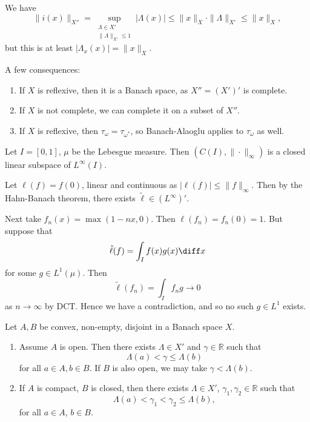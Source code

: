 \documentclass[12pt]{article}
\begin{document}
\begin{proofbox}
	We have
	\[
		\|i(x)\|_{X''} = \sup_{\substack{\Lambda \in X'\\\|\Lambda\|_{X'} \leq 1}}|\Lambda(x)| \leq \|x\|_X \cdot \|\Lambda\|_{X'} \leq \|x\|_X,
	\]
	but this is at least $|\Lambda_x(x)| = \|x\|_X$.
\end{proofbox}

A few consequences:
\begin{enumerate}
	\item If $X$ is reflexive, then it is a Banach space, as $X'' = (X')'$ is complete.
	\item If $X$ is not complete, we can complete it on a subset of $X''$.
	\item If $X$ is reflexive, then $\tau_\omega = \tau_{\omega^{\ast}}$, so Banach-Alaoglu applies to $\tau_\omega$ as well.
\end{enumerate}

\begin{exbox}
	Let $I = [0, 1]$, $\mu$ be the Lebesgue measure. Then $(C(I), \|\cdot\|_\infty)$ is a closed linear subspace of $L^\infty(I)$.

	Let $\ell(f) = f(0)$, linear and continuous as $|\ell(f)| \leq \|f\|_\infty$. Then by the Hahn-Banach theorem, there exists $\tilde \ell \in (L^\infty)'$.

	Next take $f_n(x) = \max(1-nx, 0)$. Then $\ell(f_n) = f_n(0) = 1$. But suppose that
	\[
	\tilde \ell (f) = \int_I f(x) g(x) \diff x
	\]
	for some $g \in L^1(\mu)$. Then
	\[
	\tilde \ell(f_n) = \int_I f_n g \to 0
	\]
	as $n \to \infty$ by DCT. Hence we have a contradiction, and so no such $g \in L^1$ exists.
\end{exbox}

\begin{theorem}
	Let $A, B$ be convex, non-empty, disjoint in a Banach space $X$.
	\begin{enumerate}[\normalfont(i)]
		\item Assume $A$ is open. Then there exists $\Lambda \in X'$ and $\gamma \in \mathbb{R}$ such that
			\[
			\Lambda(a) < \gamma \leq \Lambda(b)
			\]
			for all $a \in A, b \in B$. If $B$ is also open, we may take $\gamma < \Lambda(b)$.
		\item If $A$ is compact, $B$ is closed, then there exists $\Lambda \in X'$, $\gamma_1, \gamma_2 \in \mathbb{R}$ such that
			\[
			\Lambda(a) < \gamma_1 < \gamma_2 \leq \Lambda(b),
			\]
			for all $a \in A$, $b \in B$.
	\end{enumerate}
\end{theorem}
\end{document}
